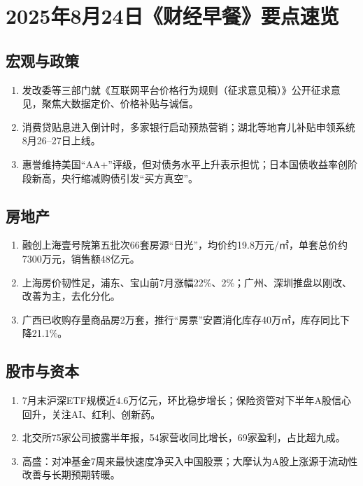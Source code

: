 \section{2025年8月24日《财经早餐》要点速览}

\subsection{宏观与政策}
\begin{enumerate}[leftmargin=*, nosep]
    \item 发改委等三部门就《互联网平台价格行为规则（征求意见稿）》公开征求意见，聚焦大数据定价、价格补贴与诚信。
    \item 消费贷贴息进入倒计时，多家银行启动预热营销；湖北等地育儿补贴申领系统8月26–27日上线。
    \item 惠誉维持美国“AA+”评级，但对债务水平上升表示担忧；日本国债收益率创阶段新高，央行缩减购债引发“买方真空”。
\end{enumerate}

\subsection{房地产}
\begin{enumerate}[leftmargin=*, nosep]
    \item 融创上海壹号院第五批次66套房源“日光”，均价约19.8万元/㎡，单套总价约7300万元，销售额48亿元。
    \item 上海房价韧性足，浦东、宝山前7月涨幅22\%、2\%；广州、深圳推盘以刚改、改善为主，去化分化。
    \item 广西已收购存量商品房2万套，推行“房票”安置消化库存40万㎡，库存同比下降21.1\%。
\end{enumerate}

\subsection{股市与资本}
\begin{enumerate}[leftmargin=*, nosep]
    \item 7月末沪深ETF规模近4.6万亿元，环比稳步增长；保险资管对下半年A股信心回升，关注AI、红利、创新药。
    \item 北交所75家公司披露半年报，54家营收同比增长，69家盈利，占比超九成。
    \item 高盛：对冲基金7周来最快速度净买入中国股票；大摩认为A股上涨源于流动性改善与长期预期转暖。
\end{enumerate}

